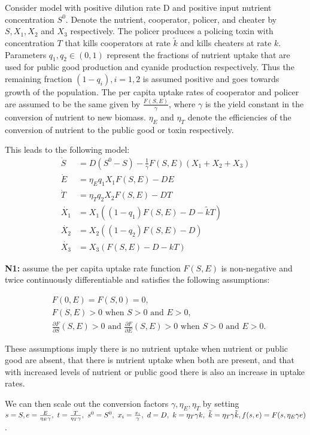 \documentclass[12pt]{article}
\begin{document}
Consider model with positive dilution rate D and positive input nutrient concentration $S^0$. Denote the nutrient, cooperator, policer, and cheater by $S, X_1, X_2$ and $X_3$ respectively. The policer produces a policing toxin with concentration $T$ that kills cooperators at rate $\tilde{k}$ and kills cheaters at rate $k$. Parameters $q_1, q_2 \in (0,1)$ represent the fractions of nutrient uptake that are used for public good production and cyanide production respectively. Thus the remaining fraction $(1-q_i), i = 1,2$ is assumed positive and goes towards growth of the population. The per capita uptake rates of cooperator and policer are assumed to be the same given by $\frac{F(S,E)}{\gamma}$, where $\gamma$ is the yield constant in the conversion of nutrient to new biomass. $\eta_E$ and $\eta_T$ denote the efficiencies of the conversion of nutrient to the public good or toxin respectively. 

\noindent This leads to the following model: 
\begin{align*}
\dot{S}&=D(S^0-S)-\frac{1}{\gamma}F(S,E)(X_1 + X_2+X_3)\\
\dot{E}&=\eta_E q_1 X_1 F(S,E)-DE\\
\dot{T}&=\eta_T q_2 X_2 F(S,E) - DT\\
\dot{X_1} &= X_1((1-q_1)F(S,E)-D- \tilde{k}T)\\
\dot{X_2}&=X_2((1-q_2)F(S,E)-D)\\
\dot{X_3}&=X_3(F(S,E)-D-kT)
\end{align*}

\noindent \textbf{N1:} assume the per capita uptake rate function $F(S,E)$ is non-negative and twice continuously differentiable and satisfies the following assumptions: 

\begin{align*}
&F(0,E)=F(S,0)=0,\\
&F(S,E)>0 \text{ when } S>0 \text{ and } E>0,\\
&\frac{\partial F}{\partial S}(S,E)>0 \text{ and } \frac{\partial F}{\partial E}(S,E)>0 \text { when } S>0 \text{ and } E>0.
\end{align*}

\noindent These assumptions imply there is no nutrient uptake when nutrient or public good are absent, that there is nutrient uptake when both are present, and that with increased levels of nutrient or public good there is also an increase in uptake rates. 

\noindent We can then scale out the conversion factors $\gamma, \eta_E , \eta_T$ by setting $s=S,\\ e=\frac{E}{\eta_E \gamma},\text{ } t=\frac{T}{\eta_T \gamma}, \text{ } s^0=S^0, \text{ }x_i=\frac{x_i}{\gamma}, \text{ }d=D,\text{ }k=\eta_T \gamma k, \text{ } \tilde{k}=\eta_T \gamma \tilde{k},\\ f(s,e)=F(s,\eta_E \gamma e)$. 
\end{document}
